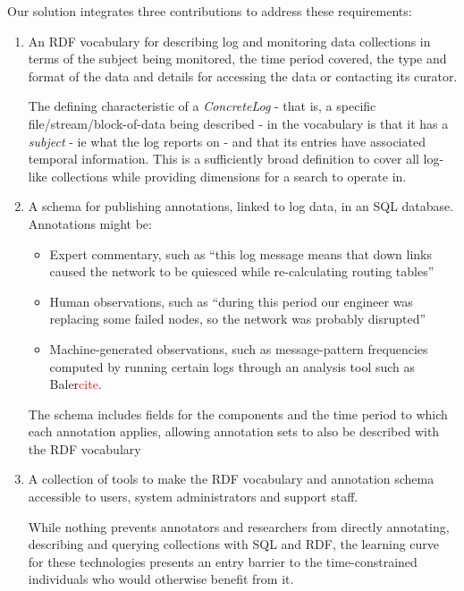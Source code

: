 Our solution integrates three contributions to address these requirements:
\begin{enumerate}
\item An RDF vocabulary for describing log and monitoring data collections
      in terms of the subject being monitored, the time period covered,
      the type and format of the data and details for accessing the data or
      contacting its curator.
      
      The defining characteristic of a \emph{ConcreteLog} - that is, a 
      specific file/stream/block-of-data being described - in the vocabulary
      is that it has a \emph{subject} - ie what the log reports on - and 
      that its entries have associated temporal information. This is a 
      sufficiently broad definition to cover all log-like collections
      while providing dimensions for a search to operate in.
      
\item A schema for publishing annotations, linked to log data, in an SQL
	  database. Annotations might be:
      
\begin{itemize}
\item Expert commentary, such as ``this log message means that down links
      caused the network to be quiesced while re-calculating routing tables''      
\item Human observations, such as ``during this period our engineer was 
      replacing some failed nodes, so the network was probably disrupted'' 
\item Machine-generated observations, such as message-pattern frequencies 
      computed by running certain logs through an analysis tool such as 
      Baler\textcolor{red}{cite}.
\end{itemize}

      The schema includes fields for the  components and the time period to 
      which each annotation applies, allowing annotation sets to also be 
      described with the RDF vocabulary

\item A collection of tools to make the RDF vocabulary and annotation 
      schema accessible to users, system administrators and support staff.

      While nothing prevents annotators and researchers from directly 
      annotating, describing and querying collections with SQL and RDF, 
      the learning curve for these technologies presents an entry 
      barrier to the time-constrained individuals who would otherwise
      benefit from it. 
      

\end{enumerate}

